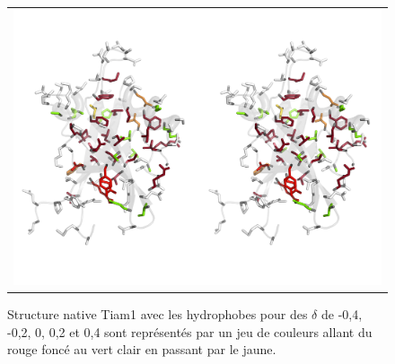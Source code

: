 \begin{landscape}
    \begin{figure}[!htbp]
      \centering
      \caption{ Structure native Tiam1 avec les hydrophobes pour des $\delta$ de -0,4, -0,2, 0, 0,2 et 0,4 sont représentés par un jeu de couleurs allant du rouge foncé au vert clair en passant par le jaune.}

      \begin{tabular}{c}
        \includegraphics[width=22cm]{titration/structure_Tiam1.png} \\
      \end{tabular}
      
      \label{titrStructTiam1}
    \end{figure}

\end{landscape}

